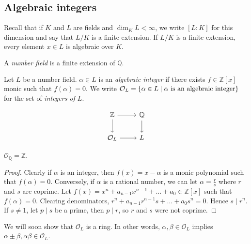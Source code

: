 \subsection{Algebraic integers}
Recall that if \( K \) and \( L \) are fields and \( \dim_K L < \infty \), we write \( [L : K] \) for this dimension and say that \( L / K \) is a finite extension.
If \( L / K \) is a finite extension, every element \( x \in L \) is algebraic over \( K \).
\begin{definition}
    A \emph{number field} is a finite extension of \( \mathbb Q \).
\end{definition}
\begin{definition}
    Let \( L \) be a number field.
    \( \alpha \in L \) is an \emph{algebraic integer} if there exists \( f \in \mathbb Z[x] \) monic such that \( f(\alpha) = 0 \).
    We write \( \mathcal O_L = \qty{\alpha \in L \mid \alpha \text{ is an algebraic integer}} \) for the set of \emph{integers of \( L \)}.
\end{definition}
\[\begin{tikzcd}
	{\mathbb Z} & {\mathbb Q} \\
	{\mathcal O_L} & L
	\arrow[from=1-1, to=1-2]
	\arrow[from=1-2, to=2-2]
	\arrow[from=1-1, to=2-1]
	\arrow[from=2-1, to=2-2]
\end{tikzcd}\]
\begin{lemma}
    \( \mathcal O_{\mathbb Q} = \mathbb Z \).
\end{lemma}
\begin{proof}
    Clearly if \( \alpha \) is an integer, then \( f(x) = x - \alpha \) is a monic polynomial such that \( f(\alpha) = 0 \).
    Conversely, if \( \alpha \) is a rational number, we can let \( \alpha = \frac{r}{s} \) where \( r \) and \( s \) are coprime.
    Let \( f(x) = x^n + a_{n-1} x^{n-1} + \dots + a_0 \in \mathbb Z[x] \) such that \( f(\alpha) = 0 \).
    Clearing denominators, \( r^n + a_{n-1} r^{n-1} s + \dots + a_0 s^n = 0 \).
    Hence \( s \mid r^n \).
    If \( s \neq 1 \), let \( p \mid s \) be a prime, then \( p \mid r \), so \( r \) and \( s \) were not coprime.
\end{proof}
We will soon show that \( \mathcal O_L \) is a ring.
In other words, \( \alpha, \beta \in \mathcal O_L \) implies \( \alpha \pm \beta, \alpha \beta \in \mathcal O_L \).

